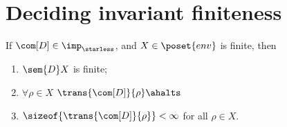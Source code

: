 \section{Deciding invariant finiteness}\label{sec:finiteness}

\begin{lemma}\label{le:finiteness}
  If \(\com[D]\in\imp_\starless\), and \(X \in \poset{env}\) is
  finite, then
  \begin{enumerate}[label=(\roman*).]
  \item \(\sem{D}X\) is finite;
  \item \(\forall \rho \in X\) \(\trans{\com[D]}{\rho}\ahalts\)
  \item \(\sizeof{\trans{\com[D]}{\rho}} < \infty\) for all
    \(\rho \in X\).
  \end{enumerate}
\end{lemma}

